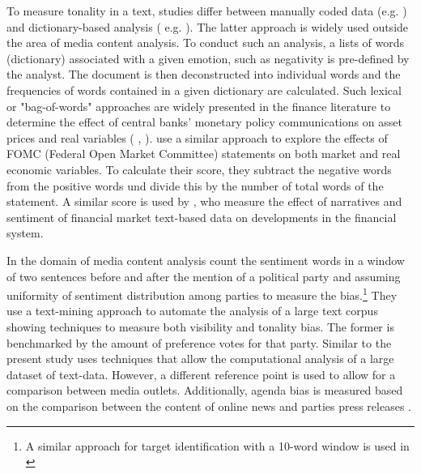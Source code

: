 \documentclass[12pt,a4paper,notitlepage]{article}
\begin{document}
To measure tonality in a text, studies differ between manually coded data (e.g. \citet{eberl_one_2017}) and dictionary-based analysis ( e.g. \citep{junque_de_fortuny_media_2012}). The latter approach is widely used outside the area of media content analysis. To conduct such an analysis, a lists of words (dictionary) associated with a given emotion, such as negativity is pre-defined by the analyst. The document is then deconstructed into individual words and the frequencies of words contained in a given dictionary are calculated. Such lexical or "bag-of-words" approaches are widely presented in the finance literature to determine the effect of central banks' monetary policy communications on asset prices and real variables (\citet{nyman_news_2018} \citet{tetlock_giving_2007}, \citet{tetlock_more_2008}). \citet{hansen_shocking_2016} use a similar approach to explore the effects of FOMC (Federal Open Market Committee) statements on both market and real economic variables. To calculate their score, they subtract the negative words from the positive words und divide this by the number of total words of the statement. A similar score is used by \citet{nyman_news_2018}, who measure the effect of narratives and sentiment of financial market text-based data on developments in the financial system. 

In the domain of media content analysis \citet{junque_de_fortuny_media_2012} count the sentiment words in a window of two sentences before and after the mention of a political party and assuming uniformity of sentiment distribution among parties to measure the bias.\footnote{A similar approach for target identification with a 10-word window is used in \citet{balahur_sentiment_2013}} They use a text-mining approach to automate the analysis of a large text corpus showing techniques to measure both visibility and tonality bias. The former is benchmarked by the amount of preference votes for that party. Similar to \citet{junque_de_fortuny_media_2012} the present study uses techniques that allow the computational analysis of a large dataset of text-data. However, a different reference point is used to allow for a comparison between media outlets. Additionally, agenda bias is measured based on the comparison between the content of online news and parties press releases \citet{eberl_one_2017}.  
\end{document}
